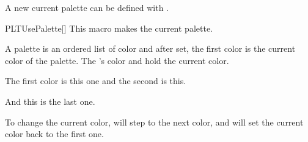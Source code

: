 \documentclass[a4paper, 11pt]{article}
\begin{document}
A new current palette can be defined with .

\begin{macro}{PLTUsePalette}[]
    This macro makes  the current palette.
\end{macro}

A palette is an ordered list of color and after set, the first color is the current color of the palette. The 's color  and  hold the current color.

\begin{tcblisting}{}

    The first color is \colorbox{PLTBGColor}{\textcolor{PLTFGColor}{this one}} and the second is \PLTNextColor\colorbox{PLTBGColor}{\textcolor{PLTFGColor}{this}}.

    \PLTNextColor
    And \colorbox{PLTBGColor}{\textcolor{PLTFGColor}{this}} is the last one.
\end{tcblisting}

\begin{tcblisting}{}


\end{tcblisting}


To change the current color,  will step to the next color, and  will set the current color back to the first one.
\end{document}
